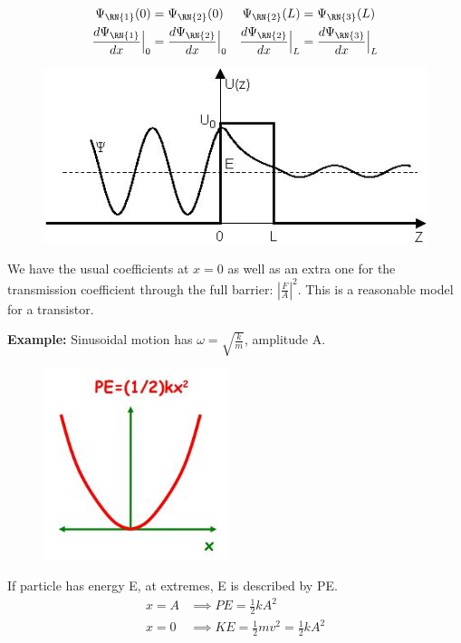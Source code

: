 \documentclass[a4paper, 11pt, normalem]{report}
\begin{document}
\begin{align}
    \Psi_{\RN{1}}(0) &= \Psi_{\RN{2}}(0) & \Psi_{\RN{2}}(L) &= \Psi_{\RN{3}}(L) \\
    \frac{d\Psi_{\RN{1}}}{dx}\Big|_{0} &= \frac{d\Psi_{\RN{2}}}{dx}\Big|_{0} & \frac{d\Psi_{\RN{2}}}{dx}\Big|_{L} &= \frac{d\Psi_{\RN{3}}}{dx}\Big|_{L}
\end{align}
\begin{figure}[H]
    \centering
    \includegraphics[scale=0.9]{PotBar.jpg}
\end{figure}
We have the usual coefficients at $x = 0$ as well as an extra one for the transmission coefficient through the full barrier: $|\frac{F}{A}|^{2}$.
This is a reasonable model for a transistor.

\textbf{Example:} Sinusoidal motion has $\omega = \sqrt{\frac{k}{m}}$, amplitude A.
\begin{figure}[H]
    \centering
    \includegraphics{Pote.jpg}
\end{figure}
If particle has energy E, at extremes, E is described by PE.
\begin{align}
    x = A &\implies PE = \frac{1}{2}kA^{2} \\
    x = 0 &\implies KE = \frac{1}{2}mv^{2} = \frac{1}{2}kA^{2}
\end{align}
\end{document}
